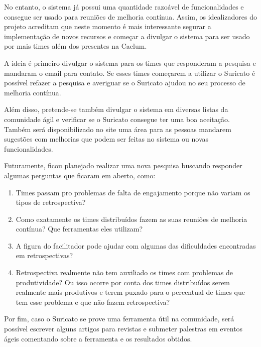 No entanto, o sistema já possui uma quantidade razoável de funcionalidades e consegue ser usado para reuniões de melhoria contínua. Assim, os idealizadores do projeto acreditam que neste momento é mais interessante segurar a implementação de novos recursos e começar a divulgar o sistema para ser usado por mais times além dos presentes na Caelum.

A ideia é primeiro divulgar o sistema para os times que responderam a pesquisa e mandaram o email para contato. Se esses times começarem a utilizar o Suricato é possível refazer a pesquisa e averiguar se o Suricato ajudou no seu processo de melhoria contínua.

Além disso, pretende-se também divulgar o sistema em diversas listas da comunidade ágil e verificar se o Suricato consegue ter uma boa aceitação. Também será disponibilizado no site uma área para as pessoas mandarem sugestões com melhorias que podem ser feitas no sistema ou novas funcionalidades.

Futuramente, ficou planejado realizar uma nova pesquisa buscando responder algumas perguntas que ficaram em aberto, como:

\begin{enumerate}
	\item Times passam pro problemas de falta de engajamento porque não variam os tipos de retrospectiva?
	\item Como exatamente os times distribuídos fazem as suas reuniões de melhoria contínua? Que ferramentas eles utilizam?
	\item A figura do facilitador pode ajudar com algumas das dificuldades encontradas em retrospectivas?
	\item Retrospectiva realmente não tem auxiliado os times com problemas de produtividade? Ou isso ocorre por conta dos times distribuídos serem realmente mais produtivos e terem puxado para  o percentual de times que tem esse problema e que não fazem retrospectiva?
\end{enumerate}

Por fim, caso o Suricato se prove uma ferramenta útil na comunidade, será possível escrever alguns artigos para revistas e submeter palestras em eventos ágeis comentando sobre a ferramenta e os resultados obtidos. 